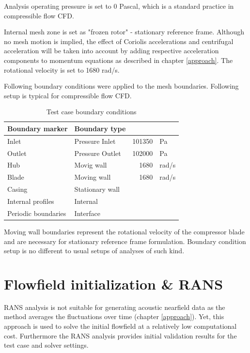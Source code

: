 Analysis operating pressure is set to 0 Pascal, which is a standard practice in compressible flow CFD.

Internal mesh zone is set as "frozen rotor" - stationary reference frame. Although no mesh motion is implied, the effect of Coriolis accelerations and centrifugal acceleration will be taken into account by adding respective acceleration components to momentum equations as described in chapter \ref{approach}. The rotational velocity is set to 1680 rad/s.

Following boundary conditions were applied to the mesh boundaries. Following setup is typical for compressible flow CFD.

\begin{table}[htb!]
\centering
\caption{Test case boundary conditions} \label{tab:testbcs}
\begin{tabular}{ | l | l | r l | } \hline
Boundary marker & Boundary type & & \\ \hline \hline
Inlet & Pressure Inlet & 101350  & Pa\\ \hline
Outlet & Pressure Outlet & 102000 & Pa \\ \hline
Hub & Movig wall & 1680 & rad/s \\ \hline
Blade & Moving wall & 1680 & rad/s \\ \hline
Casing & Stationary wall & &  \\ \hline
Internal profiles & Internal & & \\ \hline
Periodic boundaries & Interface & & \\ \hline 
\end{tabular}
\end{table}

Moving wall boundaries represent the rotational velocity of the compressor blade and are necessary for stationary reference frame formulation. Boundary condition setup is no different to usual setups of analyses of such kind.

\section{Flowfield initialization \& RANS}
RANS analysis is not suitable for generating acoustic nearfield data as the method averages the fluctuations over time (chapter \ref{approach}). Yet, this approach is used to solve the initial flowfield at a relatively low computational cost. Furthermore the RANS analysis provides initial validation results for the test case and solver settings.

